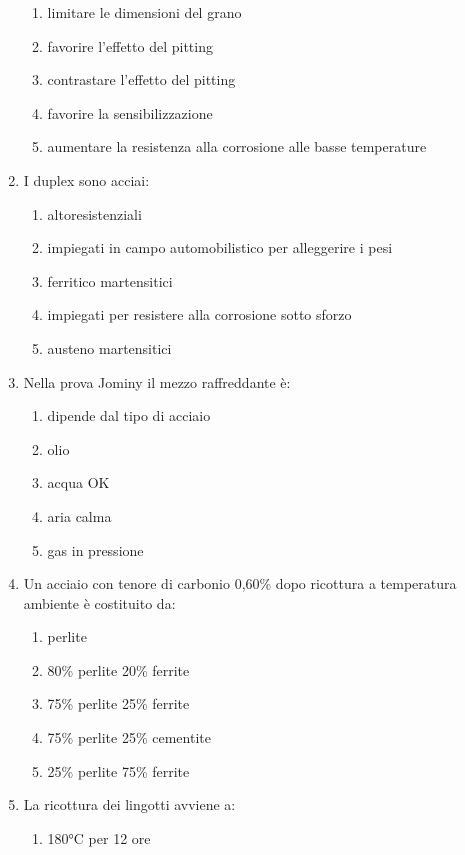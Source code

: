 \begin{enumerate}
    \begin{enumerate}
        \item limitare le dimensioni del grano
        \item favorire l'effetto del pitting
        \item contrastare l'effetto del pitting
        \item favorire la sensibilizzazione
        \item aumentare la resistenza alla corrosione alle basse temperature
    \end{enumerate}
     \item I duplex sono acciai:
    \begin{enumerate}
        \item altoresistenziali
        \item impiegati in campo automobilistico per alleggerire i pesi
        \item ferritico martensitici
        \item impiegati per resistere alla corrosione sotto sforzo
        \item austeno martensitici
    \end{enumerate}
     \item Nella prova Jominy il mezzo raffreddante è:
    \begin{enumerate}
        \item dipende dal tipo di acciaio
        \item olio
        \item acqua OK
        \item aria calma
        \item gas in pressione
    \end{enumerate}
     \item Un acciaio con tenore di carbonio 0,60\% dopo ricottura a temperatura ambiente è costituito da:
    \begin{enumerate}
        \item perlite
        \item 80\% perlite 20\% ferrite
        \item 75\% perlite 25\% ferrite
        \item 75\% perlite 25\% cementite
        \item 25\% perlite 75\% ferrite
    \end{enumerate}
     \item La ricottura dei lingotti avviene a:
    \begin{enumerate}
        \item 180°C per 12 ore

\end{enumerate}
\end{enumerate}
